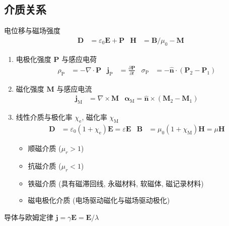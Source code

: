\documentclass[12pt,a4paper]{article}%
\numberwithin{equation}{section}%
\renewcommand*{\vec}[1]{\bm{#1}}%
\newcommand*{\uvec}[1]{\hat{\vec{#1}}}
\begin{document}
\subsection{介质关系} %
\label{sub:medium}
电位移与磁场强度
\begin{align}
    \vec D &= \varepsilon_0\vec E + \vec P & \vec H &= \vec B/\mu_0 - \vec M
\end{align}
\begin{enumerate}
    \item 电极化强度 $\vec P$ 与感应电荷
    \begin{align}
        \rho_{\mathrm P} &= -\nabla\cdot\vec P & \vec j_{\mathrm P} &= \frac{\partial \vec P}{\partial t} & \sigma_{\mathrm P} &= -\uvec n\cdot(\vec P_2 - \vec P_1)
    \end{align}
    \item 磁化强度 $\vec M$ 与感应电流
    \begin{align}
        \vec j_{\mathrm M} &= \nabla\times\vec M & \vec \alpha_{\mathrm M} = \uvec n\times(\vec M_2 - \vec M_1)
    \end{align}
    \item 线性介质与极化率 $\chi_{\mathrm e}$, 磁化率 $\chi_{\mathrm M}$
    \begin{align}
        \vec D &= \varepsilon_0(1+\chi_{\mathrm e})\vec E = \varepsilon \vec E & \vec B &= \mu_0(1+\chi_{\mathrm M})\vec H = \mu\vec H
    \end{align}
    \begin{itemize}
        \item 顺磁介质 ($\mu_r> 1$)
        \item 抗磁介质 ($\mu_r<1$) 
        \item 铁磁介质 (具有磁滞回线, 永磁材料, 软磁体, 磁记录材料)
        \item 磁电极化介质 (电场驱动磁化与磁场驱动极化)
    \end{itemize}
\end{enumerate}
导体与欧姆定律 $\vec j = \gamma\vec E = \vec E/\lambda$
\end{document}
